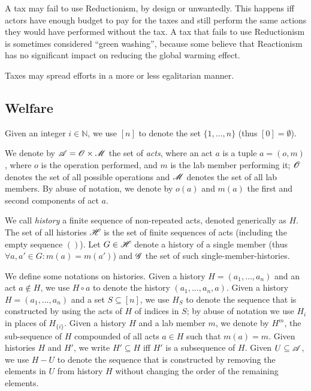 \documentclass[version=3.21, pagesize, twoside=off, bibliography=totoc, DIV=calc, fontsize=12pt, a4paper, french, english]{scrartcl}
\begin{document}
A tax may fail to use Reductionism, by design or unwantedly. This happens iff actors have enough budget to pay for the taxes and still perform the same actions they would have performed without the tax. A tax that fails to use Reductionism is sometimes considered “green washing”, because some believe that Reactionism has no significant impact on reducing the global warming effect.

Taxes may spread efforts in a more or less egalitarian manner.

\subsection{Welfare}
Given an integer $i \in \mathbb{N}$, we use $[n]$ to denote the set $\{1,\ldots, n\}$ (thus $[0] = \emptyset$). 

We denote by $\mathscr{A} = \mathscr{O} \times \mathscr{M}$ the set of \emph{acts}, where an act $a$ is a tuple $a = (o,m)$, where $o$  is the operation performed, and $m$ is the lab member performing it; $\mathscr{O}$ denotes the set of all possible operations and $\mathscr{M}$ denotes the set of all lab members. By abuse of notation, we denote by $o(a)$ and $m(a)$ the first and second components of act $a$. 

We call \emph{history} a finite sequence of non-repeated acts, denoted generically as $H$. 
The set of all histories $\mathscr{H}$ is the set of finite sequences of acts (including the empty sequence $()$). 
Let $G \in \mathscr{H}$ denote a history of a single member (thus $\forall a, a' \in G: m(a) = m(a')$) and $\mathscr{G}$ the set of such single-member-histories.

We define some notations on histories. 
Given a history $H = (a_1,\ldots,a_n)$ and an act $a\not\in H$, we use $H\circ a$ to  denote the history $(a_1,\ldots, a_n, a)$. 
Given a history $H = (a_1,\ldots,a_n)$ and a set $S\subseteq [n]$, we use $H_S$ to denote the sequence that is constructed by using the acts of $H$ of indices in $S$; by abuse of notation we use $H_i$ in places of $H_{\{i\}}$. 
Given a history $H$ and a lab member $m$, we denote by $H^{m}$, the sub-sequence of $H$ compounded of all acts $a\in H$ such that $m(a) = m$. 
Given histories $H$ and $H'$, we write $H'\subseteq H$ iff $H'$ is a subsequence of $H$.
Given $U \subseteq \mathscr{A}$,  we use $H - U$ to denote the sequence that is constructed by removing the elements in $U$ from history $H$ without changing the order of the remaining elements.
\end{document}

